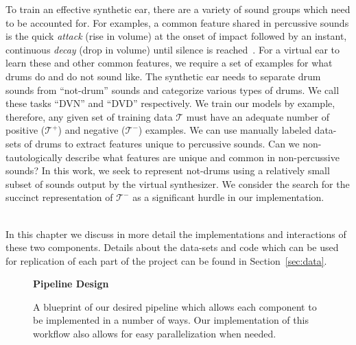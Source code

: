 \documentclass[\main/thesis.tex]{subfiles}
\begin{document}
To train an effective synthetic ear, there are a variety of sound groups which need to be accounted for. For examples, a common feature shared in percussive sounds is the quick \emph{attack} (rise in volume) at the onset of impact followed by an instant, continuous \emph{decay} (drop in volume) until silence is reached~\cite{barry2005drum}. For a virtual ear to learn these and other common features, we require a set of examples for what drums do and do not sound like. The synthetic ear needs to separate drum sounds from \enquote{not-drum} sounds and categorize various types of drums. We call these tasks \enquote{DVN} and \enquote{DVD} respectively. We train our models by example, therefore, any given set of training data $\mathcal{T}$ must have an adequate number of positive ($\mathcal{T^{+}}$) and negative ($\mathcal{T^{-}}$) examples. We can use manually labeled data-sets of drums to extract features unique to percussive sounds. Can we non-tautologically describe what features are unique and common in non-percussive sounds? In this work, we seek to represent not-drums using a relatively small subset of sounds output by the virtual synthesizer. We consider the search for the succinct representation of $\mathcal{T^{-}}$ as a significant hurdle in our implementation.


\\
In this chapter we discuss in more detail the implementations and interactions of these two components. Details about the data-sets and code which can be used for replication of each part of the project can be found in Section~\ref{sec:data}.

 \begin{figure}[t!]
    \begin{center}
    \textbf{Pipeline Design}
    \end{center}
    \caption{A blueprint of our desired pipeline which allows each component to be implemented in a number of ways. Our implementation of this workflow also allows for easy parallelization when needed.
    }
\label{fig:pipeline_outline}
\end{figure}
\end{document}
